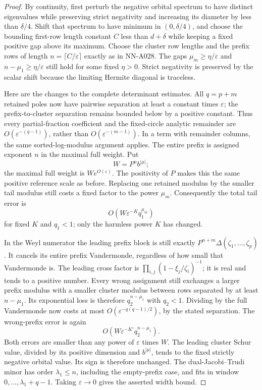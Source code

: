 \begin{proof}
By continuity, first perturb the negative orbital spectrum to have
distinct eigenvalues while preserving strict negativity and increasing
its diameter by less than $\delta/4$. Shift that spectrum to have minimum in $(0,\delta/4)$,
and choose the bounding first-row length constant $C$ less than
$d+\delta$ while keeping a fixed positive gap above its maximum.
Choose the cluster row lengths and the prefix rows of length
$n=\lceil C/\varepsilon\rceil$ exactly as in NN-A028. The gaps
$\mu_m\ge\eta/\varepsilon$ and
$n-\mu_1\ge\eta/\varepsilon$ still hold for some fixed $\eta>0$.
Strict negativity is preserved by the scalar shift because the
limiting Hermite diagonal is traceless.

Here are the changes to the complete determinant estimates.
All $q=p+m$ retained poles now have pairwise separation at least a
constant times $\varepsilon$; the prefix-to-cluster separation remains
bounded below by a positive constant. Thus every partial-fraction
coefficient and the fixed-circle analytic remainder are
$O(\varepsilon^{-(q-1)})$, rather than
$O(\varepsilon^{-(m-1)})$. In a term with remainder columns, the same
sorted-log-modulus argument applies. The entire prefix is assigned
exponent $n$ in the maximal full weight. Put
\[
                  W=P^n b^{|\mu|};
\]
the maximal full weight is $W e^{O(\varepsilon)}$.
The positivity of $P$ makes this the same positive reference scale
as before. Replacing one retained modulus by the smaller tail modulus
still costs a fixed factor to the power $\mu_m$. Consequently the
total tail error is
\[
                     O(W\varepsilon^{-K}q_1^{\mu_m})
\]
for fixed $K$ and $q_1<1$; only the harmless power $K$ has changed.

In the Weyl numerator the leading prefix block is still exactly
$P^{n+m}\Delta(\zeta_1,\ldots,\zeta_p)$. It cancels its entire
prefix Vandermonde, regardless of how small that Vandermonde is.
The leading cross factor is
$\prod_{i,j}(1-\xi_j/\zeta_i)^{-1}$; it is real and tends to a
positive number. Every wrong assignment still exchanges a larger
prefix modulus with a smaller cluster modulus between rows separated
by at least $n-\mu_1$. Its exponential loss is therefore
$q_2^{n-\mu_1}$ with $q_2<1$. Dividing by the full Vandermonde now
costs at most $O(\varepsilon^{-q(q-1)/2})$, by the stated separation.
The wrong-prefix error is again
\[
                      O(W\varepsilon^{-K'}q_2^{n-\mu_1}).
\]
Both errors are smaller than any power of $\varepsilon$ times $W$.
The leading cluster Schur value, divided by its positive dimension
and $b^{|\mu|}$, tends to the fixed strictly negative orbital value.
Its sign is therefore unchanged. The dual-Jacobi--Trudi minor has
order $\lambda_1\le n$, including the empty-prefix case, and fits
in window $0,\ldots,\lambda_1+q-1$. Taking $\varepsilon\to0$
gives the asserted width bound.
\end{proof}

